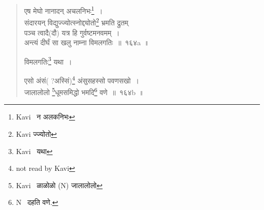 \documentclass[11pt, openany]{book}
\begin{document}
\begin{quote}
{एष मेघो नानादन् अचलनिभः\renewcommand{\thefootnote}{9}\footnote{Kavi \textendash\ न अलकनिभः}~।\\
संदारयन् विद्युज्ज्योत्स्नोद्द्योतो\renewcommand{\thefootnote}{10}\footnote{Kavi ज्ज्योतो} भ्रमति द्रुतम्\\
पञ्च त्वादै(दौ) यत्र हि गुर्वष्टमनवमम्~।\\
अन्त्यं दीर्घं सा खलु नाम्ना विमलगतिः~॥~१६४a~॥}

विमलगतिः\renewcommand{\thefootnote}{11}\footnote{Kavi \textendash\ यथा} यथा~।

{\na एसो अंसं( ?अस्सिं)\renewcommand{\thefootnote}{12}\footnote{not read by Kavi} अंसुसहस्सो पवणसखो~।\\
जालालोलो \renewcommand{\thefootnote}{13}\footnote{Kavi \textendash\ ळाळोळो (N) जालालोलो}धूमसमिद्धो भमदि\renewcommand{\thefootnote}{14}\footnote{N \textendash\ दहति वणे.} वणे~॥~१६४b~॥}

{ }
\end{quote}

\newpage
\end{document}
